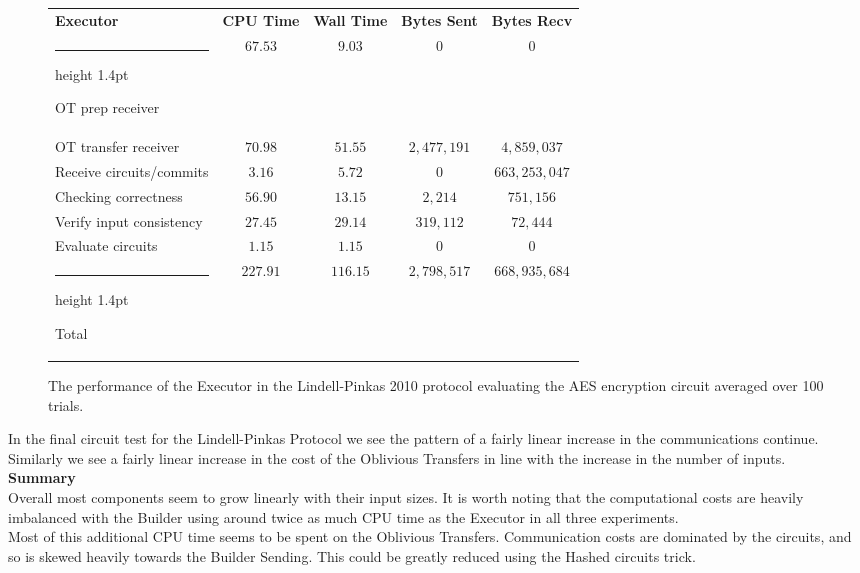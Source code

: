 \documentclass[11pt]{article} %
\makeatletter
\newcommand{\thickhline}{%
    \noalign {\ifnum 0=`}\fi \hrule height 1.4pt
    \futurelet \reserved@a \@xhline
}
\makeatother
\begin{document}
				\begin{figure}[!ht]
					\begin{tabular}{| p{4.3cm} | c c c c |}
						\hline
						\textbf{Executor} & \textbf{CPU Time} & \textbf{Wall Time} & \textbf{Bytes Sent} & \textbf{Bytes Recv} \\
						\thickhline
						OT prep receiver & $67.53$ & $9.03$ & $0$ & $0$ \\
						\hline
						OT transfer receiver & $70.98$ & $51.55$ & $2,477,191$ & $4,859,037$ \\
						\hline
						Receive circuits/commits & $3.16$ & $5.72$ & $0$ & $663,253,047$ \\
						\hline
						Checking correctness & $56.90$ & $13.15$ & $2,214$ & $751,156$ \\
						\hline
						Verify input consistency & $27.45$ & $29.14$ & $319,112$ & $72,444$ \\
						\hline
						Evaluate circuits & $1.15$ & $1.15$ & $0$ & $0$ \\
						\thickhline
						Total & $227.91$ & $116.15$ & $2,798,517$ & $668,935,684$ \\
						\hline
					\end{tabular}
					\caption{The performance of the Executor in the Lindell-Pinkas 2010 protocol evaluating the AES encryption circuit averaged over 100 trials. \label{table:LP_2010_AES_Executor}}
				\end{figure}
				\FloatBarrier

				In the final circuit test for the Lindell-Pinkas Protocol we see the pattern of a fairly linear increase in the communications continue. Similarly we see a fairly linear increase in the cost of the Oblivious Transfers in line with the increase in the number of inputs.\\

			\noindent\textbf{Summary}\\

				Overall most components seem to grow linearly with their input sizes. It is worth noting that the computational costs are heavily imbalanced with the Builder  using around twice as much CPU time as the Executor in all three experiments.\\

				Most of this additional CPU time seems to be spent on the Oblivious Transfers. Communication costs are dominated by the circuits, and so is skewed heavily towards the Builder Sending. This could be greatly reduced using the Hashed circuits trick.\\
\end{document}
